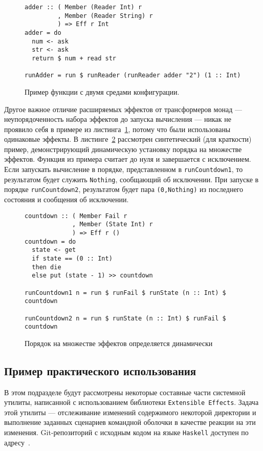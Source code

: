 \begin{figure}[t]
\begin{lstlisting}
adder :: ( Member (Reader Int) r
         , Member (Reader String) r
         ) => Eff r Int
adder = do
  num <- ask
  str <- ask
  return $ num + read str

runAdder = run $ runReader (runReader adder "2") (1 :: Int)
\end{lstlisting}
\caption{Пример функции с двумя средами конфигурации.}
\label{listing:extEff2Readers}
\end{figure}

Другое важное отличие расширяемых эффектов от трансформеров монад --- 
неупорядоченность набора эффектов до запуска вычисления --- никак не проявило 
себя в примере из листинга~\ref{listing:extEff2Readers}, потому что были 
использованы одинаковые эффекты. В листинге~\ref{listing:extEffOrdering} 
рассмотрен синтетический (для краткости) пример, демонстрирующий динамическую 
установку порядка на множестве эффектов. Функция из примера считает до нуля и 
завершается с исключением. Если запускать вычисление в порядке, представленном 
в \lstinline{runCountdown1}, то результатом будет служить \lstinline{Nothing}, 
сообщающий об исключении. При запуске в порядке \lstinline{runCountdown2}, 
результатом будет пара \lstinline{(0,Nothing)} из последнего состояния и 
сообщения об исключении.

\begin{figure}[t]
\begin{lstlisting}
countdown :: ( Member Fail r
             , Member (State Int) r
             ) => Eff r ()
countdown = do
  state <- get
  if state == (0 :: Int)
  then die
  else put (state - 1) >> countdown

runCountdown1 n = run $ runFail $ runState (n :: Int) $ countdown

runCountdown2 n = run $ runState (n :: Int) $ runFail $ countdown
\end{lstlisting}
\caption{Порядок на множестве эффектов определяется динамически}
\label{listing:extEffOrdering}
\end{figure}

\subsection{Пример практического использования}

В этом подразделе будут рассмотрены некоторые составные части системной утилиты,
написанной с использованием библиотеки \lstinline{Extensible Effects}. 
Задача этой утилиты --- отслеживание изменений содержимого некоторой директории
и выполнение заданных сценариев командной оболочки в качестве реакции на эти 
изменения. Git-репозиторий с исходным кодом на языке \lstinline{Haskell} 
доступен по адресу~\cite{fileTrigger}.

